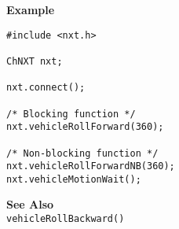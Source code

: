 \noindent
{\bf Example}
\begin{verbatim}
#include <nxt.h>

ChNXT nxt;

nxt.connect();

/* Blocking function */
nxt.vehicleRollForward(360);

/* Non-blocking function */
nxt.vehicleRollForwardNB(360);
nxt.vehicleMotionWait();
\end{verbatim}

\noindent
{\bf See Also}\\
\texttt{vehicleRollBackward()}

